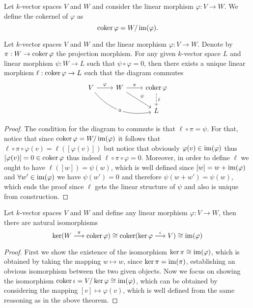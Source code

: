 \begin{definition}[Cokernel]
  Let \(k\)-vector spaces \(V\) and \(W\) and consider the linear morphism
  \(\varphi : V \to W\). We define the cokernel of \(\varphi\) as
  \[
    \operatorname{coker} \varphi = W/\operatorname{im}(\varphi).
  \] 
\end{definition}

\begin{theorem}
   Let \(k\)-vector spaces \(V\) and \(W\) and the linear morphism \(\varphi : V
   \to W\). Denote by \(\pi : W \to \operatorname{coker} \varphi\) the projection morphism.
   For any given \(k\)-vector space \(L\) and linear morphism \(\psi : W \to L\)
   such that  \(\psi \circ \varphi = 0\), then there exists a unique linear
   morphism  \(\ell : \operatorname{coker} \varphi \to L\) such that the diagram commutes
   \[
     \begin{tikzcd}
       V \ar[drr, bend right, "0" description] \ar[r, "\varphi"] &W \ar[r,
       "\pi"] \ar[dr, "\psi"] &\coker \varphi \ar[d, dashed, "\ell"] 
       \\
        & &L
     \end{tikzcd}
   \] 
\end{theorem}

\begin{proof}
  The condition for the diagram to commute is that \(\ell \circ \pi = \psi\).
  For that, notice that since \(\operatorname{coker} \varphi = W/\operatorname{im}(\varphi)\) it follows
  that \(\ell \circ \pi \circ \varphi (v) = \ell([\varphi(v)])\) but notice that
  obviously \(\varphi(v) \in \operatorname{im}(\varphi)\) thus \([\varphi(v)] = 0 \in \operatorname{coker}
  \varphi\) thus indeed \(\ell \circ \pi \circ \varphi = 0\). Moreover, in order
  to define \(\ell\) we ought to have \(\ell([w]) = \psi(w)\), which is well
  defined since \([w] = w + \operatorname{im}(\varphi)\) and \(\forall w' \in \operatorname{im}(\varphi)\) 
  we have \(\psi(w') = 0\) and therefore \(\psi(w + w') = \psi(w)\), which ends
  the proof since \(\ell\) gets the linear structure of \(\psi\) and also is
  unique from construction.
\end{proof}

\begin{proposition}
  Let \(k\)-vector spaces \(V\) and \(W\) and define any linear morphism
  \(\varphi : V \to W\), then there are natural isomorphisms 
  \[
    \ker(W \overset \pi \longrightarrow \operatorname{coker} \varphi) \cong \operatorname{coker}(\ker \varphi
    \overset \iota \longrightarrow V) \cong \operatorname{im}(\varphi)
  \] 
\end{proposition}

\begin{proof}
  First we show the existence of the isomorphism \(\ker \pi \cong \operatorname{im}(\varphi)\),
  which is obtained by taking the mapping \(w \mapsto w\), since \(\ker \pi =
  \operatorname{im}(\pi)\), establishing an obvious isomorphism between the two given objects.
  Now we focus on showing the isomorphism \(\operatorname{coker} \iota = V/\ker \varphi \cong
  \operatorname{im}(\varphi)\), which can be obtained by considering the mapping \([v] \mapsto
  \varphi(v)\), which is well defined from the same reasoning as in the above
  theorem.
\end{proof}

